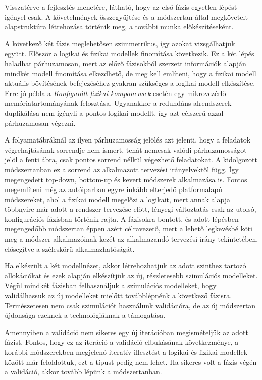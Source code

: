         Visszatérve a fejlesztés menetére, látható, hogy az első fázis egyetlen lépést igényel csak. A követelmények összegyűjtése és a módszertan által megkövetelt alapstruktúra létrehozása történik meg, a további munka előkészítéseként.
        
        A következő két fázis meglehetősen szimmetrikus, így azokat vizsgálhatjuk együtt. Először a logikai és fizikai modellek finomítása következik. Ez a két lépés haladhat párhuzamosan, mert az előző fázisokból szerzett információk alapján mindkét modell finomítása elkezdhető, de meg kell említeni, hogy a fizikai modell aktuális bővítésének befejezéséhez gyakran szükséges a logikai modell elkészítése. Erre jó példa a \emph{Konfigurált fizikai komponensek} esetén egy mikrovezérlő memóriatartományának felosztása.
        Ugyanakkor a redundáns alrendszerek duplikálása nem igényli a pontos logikai modellt, így azt célszerű azzal párhuzamosan végezni.
        
        A folyamatábráknál az ilyen párhuzamosság jelölés azt jelenti, hogy a feladatok végrehajtásának sorrendje nem ismert, tehát nemcsak valódi párhuzamosságot jelöl a fenti ábra, csak pontos sorrend nélkül végezhető feladatokat.
        A kidolgozott módszertanban ez a sorrend az alkalmazott tervezési irányelvektől függ. Így megengedett top-down, bottom-up és kevert módszerek alkalmazása is. Fontos megemlíteni még az autóiparban egyre inkább elterjedő platformalapú módszereket, ahol a fizikai modell megelőzi a logikait, mert annak alapja többnyire már adott a rendszer tervezése előtt, lényegi változtatás csak az utolsó, konfigurációs fázisban történik rajta.
        A fázisokra bontott, és adott lépésben megengedőbb módszertan éppen azért célravezető, mert a lehető legkevésbé köti meg a módszer alkalmazóinak kezét az alkalmazandó tervezési irány tekintetében, elősegítve a széleskörű alkalmazhatóságát.
        
        Ha elkészült a két modellnézet, akkor létrehozhatjuk az adott szinthez tartozó allokációkat és ezek alapján elkészítjük az új, részletesebb szimulációs modelleket.
        Végül mindkét fázisban felhasználjuk a szimulációs modelleket, hogy validálhassuk az új modelleket mielőtt továbblépnénk a következő fázisra. Természetesen nem csak szimulációt használunk validációra, de az új módszertan újdonsága ezeknek a technológiáknak a támogatása.
        
        Amennyiben a validáció nem sikeres egy új iterációban megismételjük az adott fázist. Fontos, hogy ez az iteráció a validáció elbukásának következménye, a korábbi módszerekben megjelenő iteratív illesztést a logikai és fizikai modellek között már feloldottuk, ezt a típust pedig nem lehet.
        Ha sikeres volt a fázis végén a validáció, akkor tovább lépünk a módszertanban.
        
